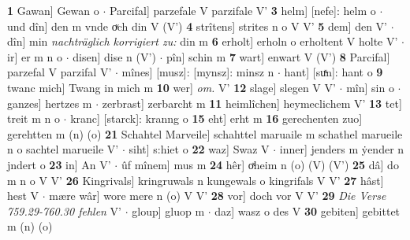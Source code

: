 \documentclass[8pt,a4paper,notitlepage]{article}
\begin{document}
\begin{table}[ht]
\begin{minipage}[t]{0.5\linewidth}
\textbf{1} Gawan] Gewan o  $\cdot$ Parcifal] parzefale V parzifale V' \textbf{3} helm] [nefe]: helm o  $\cdot$ und dîn] den m vnde oͮch din V (V') \textbf{4} strîtens] strites n o V V' \textbf{5} dem] den V'  $\cdot$ dîn] min \textit{nachträglich korrigiert zu:} din m \textbf{6} erholt] erholn o erholtent V holte V'  $\cdot$ ir] er m n o  $\cdot$ disen] dise n (V')  $\cdot$ pîn] schin m \textbf{7} wart] enwart V (V') \textbf{8} Parcifal] parzefal V parzifal V'  $\cdot$ mînes] [musz]: [mynsz]: minsz n  $\cdot$ hant] [suͯn]: hant o \textbf{9} twanc mich] Twang in mich m \textbf{10} wer] \textit{om.} V' \textbf{12} slage] slegen V V'  $\cdot$ mîn] sin o  $\cdot$ ganzes] hertzes m  $\cdot$ zerbrast] zerbarcht m \textbf{11} heimlîchen] heymeclichem V' \textbf{13} tet] treit m n o  $\cdot$ kranc] [starck]: kranng o \textbf{15} eht] erht m \textbf{16} gerechenten zuo] gerehtten m (n) (o) \textbf{21} Schahtel Marveile] schahttel maruaile m schathel marueile n o sachtel marueile V'  $\cdot$ siht] s:hiet o \textbf{22} waz] Swaz V  $\cdot$ inner] jenders m ẏender n jndert o \textbf{23} in] An V'  $\cdot$ ûf mînem] mus m \textbf{24} hêr] oͯheim n (o) (V) (V') \textbf{25} dâ] do m n o V V' \textbf{26} Kingrivals] kringruwals n kungewals o kingrifals V V' \textbf{27} hâst] hest V  $\cdot$ mære wâr] wore mere n (o) V V' \textbf{28} vor] doch vor V V' \textbf{29} \textit{Die Verse 759.29-760.30 fehlen} V'   $\cdot$ gloup] gluop m  $\cdot$ daz] wasz o des V \textbf{30} gebiten] gebittet m (n) (o) \newline
\end{minipage}
\end{table}
\newpage
\end{document}
